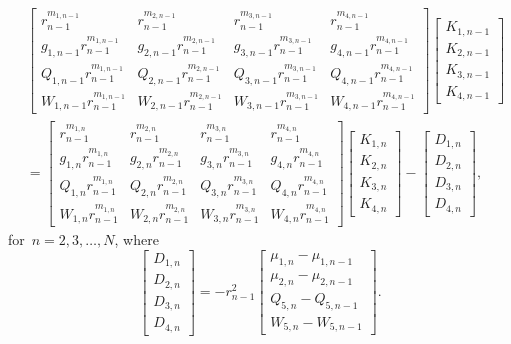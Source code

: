 \documentclass[preprint,10pt,times]{elsarticle}
\numberwithin{equation}{section}
\renewcommand{\>}{$\Rightarrow$}
\begin{document}
\begin{equation}
\begin{aligned}
& \begin{bmatrix}
	r_{n-1}^{m_{1,n-1}} & r_{n-1}^{m_{2,n-1}} & r_{n-1}^{m_{3,n-1}} & r_{n-1}^{m_{4,n-1}} \\
	g_{1,n-1} r_{n-1}^{m_{1,n-1}} & g_{2,n-1} r_{n-1}^{m_{2,n-1}} & g_{3,n-1} r_{n-1}^{m_{3,n-1}} & g_{4,n-1} r_{n-1}^{m_{4,n-1}} \\
	Q_{1,n-1} r_{n-1}^{m_{1,n-1}} & Q_{2,n-1} r_{n-1}^{m_{2,n-1}} & Q_{3,n-1} r_{n-1}^{m_{3,n-1}} & Q_{4,n-1} r_{n-1}^{m_{4,n-1}} \\
	W_{1,n-1} r_{n-1}^{m_{1,n-1}} & W_{2,n-1} r_{n-1}^{m_{2,n-1}} & W_{3,n-1} r_{n-1}^{m_{3,n-1}} & W_{4,n-1} r_{n-1}^{m_{4,n-1}}
\end{bmatrix}
\begin{bmatrix}
	K_{1,n-1} \\ K_{2,n-1} \\ K_{3,n-1} \\ K_{4,n-1}
\end{bmatrix}\\
& =
  \begin{bmatrix}
	r_{n-1}^{m_{1,n}} & r_{n-1}^{m_{2,n}} & r_{n-1}^{m_{3,n}} & r_{n-1}^{m_{4,n}} \\
	g_{1,n} r_{n-1}^{m_{1,n}} & g_{2,n} r_{n-1}^{m_{2,n}} & g_{3,n} r_{n-1}^{m_{3,n}} & g_{4,n} r_{n-1}^{m_{4,n}} \\
	Q_{1,n} r_{n-1}^{m_{1,n}} & Q_{2,n} r_{n-1}^{m_{2,n}} & Q_{3,n} r_{n-1}^{m_{3,n}} & Q_{4,n} r_{n-1}^{m_{4,n}} \\
	W_{1,n} r_{n-1}^{m_{1,n}} & W_{2,n} r_{n-1}^{m_{2,n}} & W_{3,n} r_{n-1}^{m_{3,n}} & W_{4,n} r_{n-1}^{m_{4,n}}
  \end{bmatrix}
  \begin{bmatrix}
	K_{1,n} \\ K_{2,n} \\ K_{3,n} \\ K_{4,n}
  \end{bmatrix}
-
\begin{bmatrix}
	D_{1,n} \\ D_{2,n} \\ D_{3,n} \\ D_{4,n}
\end{bmatrix},
\label{eq:eqs of Kin_two_mat_no_slip_original}
\end{aligned}
\end{equation}
for~$n = 2,3,\dots,N$, where
\begin{equation}
	\begin{bmatrix}
		D_{1,n} \\ D_{2,n} \\ D_{3,n} \\ D_{4,n}
	\end{bmatrix}
	= - r^2_{n-1}
	\begin{bmatrix}
		\mu_{1,n}-\mu_{1,n-1} \\ \mu_{2,n}-\mu_{2,n-1}  \\ Q_{5,n}-Q_{5,n-1} \\ W_{5,n}-W_{5,n-1}
	\end{bmatrix}.
\end{equation}
\end{document}
